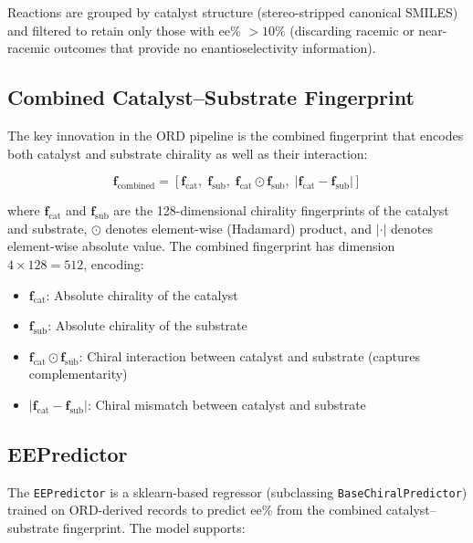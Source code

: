 \documentclass[11pt,a4paper]{article}
\begin{document}
Reactions are grouped by catalyst structure (stereo-stripped canonical SMILES)
and filtered to retain only those with ee\% $> 10\%$ (discarding racemic or
near-racemic outcomes that provide no enantioselectivity information).

\subsection{Combined Catalyst--Substrate Fingerprint}

The key innovation in the ORD pipeline is the combined fingerprint that encodes
both catalyst and substrate chirality as well as their interaction:

\begin{equation}
  \mathbf{f}_{\text{combined}} = \left[
    \mathbf{f}_{\text{cat}},\;
    \mathbf{f}_{\text{sub}},\;
    \mathbf{f}_{\text{cat}} \odot \mathbf{f}_{\text{sub}},\;
    \left|\mathbf{f}_{\text{cat}} - \mathbf{f}_{\text{sub}}\right|
  \right]
  \label{eq:combined_fp}
\end{equation}

where $\mathbf{f}_{\text{cat}}$ and $\mathbf{f}_{\text{sub}}$ are the
128-dimensional chirality fingerprints of the catalyst and substrate, $\odot$
denotes element-wise (Hadamard) product, and $|\cdot|$ denotes element-wise
absolute value. The combined fingerprint has dimension $4 \times 128 = 512$,
encoding:

\begin{itemize}[leftmargin=1.5em]
  \item $\mathbf{f}_{\text{cat}}$: Absolute chirality of the catalyst
  \item $\mathbf{f}_{\text{sub}}$: Absolute chirality of the substrate
  \item $\mathbf{f}_{\text{cat}} \odot \mathbf{f}_{\text{sub}}$: Chiral
    interaction between catalyst and substrate (captures complementarity)
  \item $|\mathbf{f}_{\text{cat}} - \mathbf{f}_{\text{sub}}|$: Chiral mismatch
    between catalyst and substrate
\end{itemize}

\subsection{EEPredictor}

The \texttt{EEPredictor} is a sklearn-based regressor (subclassing
\texttt{BaseChiralPredictor}) trained on ORD-derived records to predict ee\%
from the combined catalyst--substrate fingerprint. The model supports:
\end{document}
